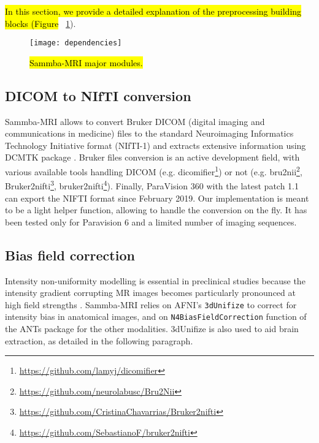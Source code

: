 \documentclass[utf8, a4paper, final, crop]{frontiersSCNS}
\newcommand{\bashinline}[1]{\texttt{#1}}
\begin{document}
\hl{In this section, we provide a detailed explanation
of the preprocessing building blocks (Figure} ~\ref{fig:architecture}).
\begin{figure}[h!]
\begin{center}
\texttt{[image: dependencies]}
\end{center}
\caption{\hl{Sammba-MRI major modules.}}\label{fig:architecture}
\end{figure}

\subsection{DICOM to NIfTI conversion}
Sammba-MRI allows to convert Bruker DICOM (digital imaging and communications in medicine) files to the standard  Neuroimaging Informatics Technology Initiative  format (NIfTI-1) and extracts extensive information using DCMTK package  \citep{eichelberg2004ten}. 
Bruker files conversion is an active development field,
with various available tools handling DICOM (e.g. 
dicomifier\footnote{\url{https://github.com/lamyj/dicomifier}}) or
not (e.g. bru2nii\footnote{\url{https://github.com/neurolabusc/Bru2Nii}},
Bruker2nifti\footnote{\url{https://github.com/CristinaChavarrias/Bruker2nifti}}, bruker2nifti\footnote{\url{https://github.com/SebastianoF/bruker2nifti}}).
Finally, ParaVision 360 with the latest patch 1.1 can export the NIFTI format since February 2019.
Our implementation is meant to be a light helper function, allowing to 
handle the conversion on the fly. It has been tested only for Paravision 6
and a limited number of imaging sequences.

\subsection{Bias field correction}
Intensity non-uniformity modelling is essential in preclinical studies
because the intensity gradient corrupting MR images becomes
particularly pronounced at high field strengths \citep{boyes2008intensity}.
Sammba-MRI relies on AFNI's \bashinline{3dUnifize} to correct for intensity bias in
anatomical images, and on \bashinline{N4BiasFieldCorrection} function
of the ANTs package \citep{tustison2010n4itk}
for the other modalities. 3dUnifize is also used to aid brain extraction,
as detailed in the following paragraph.
\end{document}
